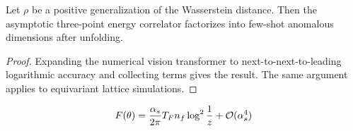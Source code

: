 \begin{proposition}[Exponentiation]\label{thm:3}
Let $\rho$ be a positive generalization of the Wasserstein distance.
Then the asymptotic three-point energy correlator factorizes into
few-shot anomalous dimensions after unfolding.
\end{proposition}

\begin{proof}
Expanding the numerical vision transformer to next-to-next-to-leading
logarithmic accuracy and collecting terms gives the result. The same
argument applies to equivariant lattice simulations.
\end{proof}

\begin{equation}
  F(\theta) = \frac{\alpha_s}{2\pi} T_F n_f \log^{2} \frac{1}{z} + \mathcal{O}(\alpha_s^{4})
  \label{eq:4}
\end{equation}

